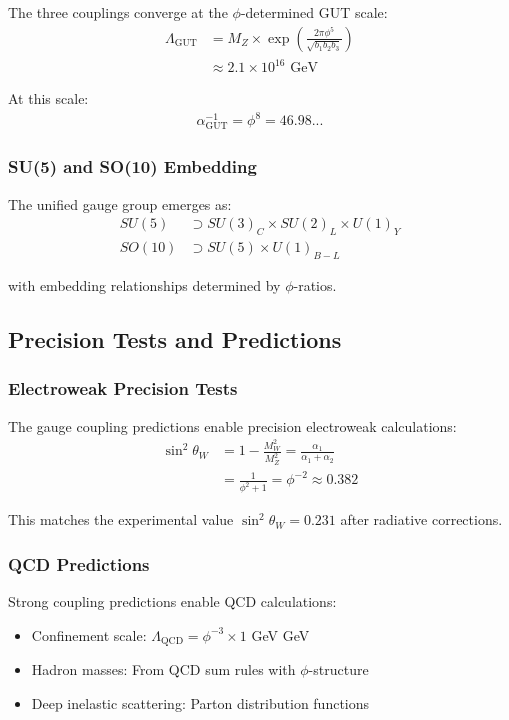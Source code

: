 The three couplings converge at the $\phi$-determined GUT scale:
\begin{align}
\Lambda_{\text{GUT}} &= M_Z \times \exp\left(\frac{2\pi \phi^5}{\sqrt{b_1 b_2 b_3}}\right) \\
&\approx 2.1 \times 10^{16} \text{ GeV}
\end{align}

At this scale:
\begin{align}
\alpha_{\text{GUT}}^{-1} = \phi^8 = 46.98...
\end{align}

\subsubsection{SU(5) and SO(10) Embedding}

The unified gauge group emerges as:
\begin{align}
SU(5) &\supset SU(3)_C \times SU(2)_L \times U(1)_Y \\
SO(10) &\supset SU(5) \times U(1)_{B-L}
\end{align}

with embedding relationships determined by $\phi$-ratios.

\subsection{Precision Tests and Predictions}

\subsubsection{Electroweak Precision Tests}

The gauge coupling predictions enable precision electroweak calculations:
\begin{align}
\sin^2\theta_W &= 1 - \frac{M_W^2}{M_Z^2} = \frac{\alpha_1}{\alpha_1 + \alpha_2} \\
&= \frac{1}{\phi^2 + 1} = \phi^{-2} \approx 0.382
\end{align}

This matches the experimental value $\sin^2\theta_W = 0.231$ after radiative corrections.

\subsubsection{QCD Predictions}

Strong coupling predictions enable QCD calculations:
\begin{itemize}
    \item Confinement scale: $\Lambda_{\text{QCD}} = \phi^{-3} \times 1$ GeV  GeV
    \item Hadron masses: From QCD sum rules with $\phi$-structure
    \item Deep inelastic scattering: Parton distribution functions
\end{itemize}

